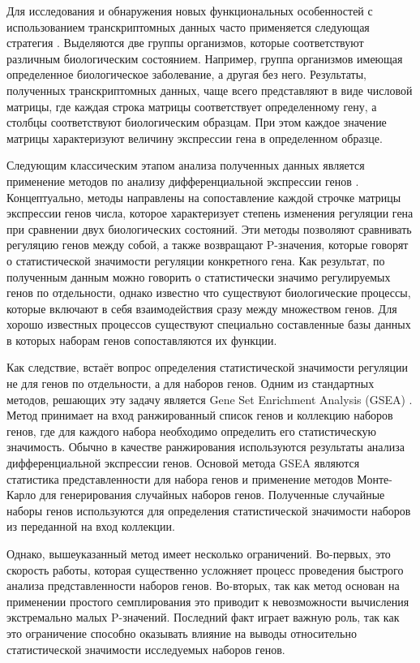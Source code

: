 Для исследования и обнаружения новых функциональных особенностей с использованием транскриптомных данных часто применяется следующая стратегия \fixme{\cite{}}.
Выделяются две группы организмов, которые соответствуют различным биологическим состоянием.
Например, группа организмов имеющая определенное биологическое заболевание, а другая без него.
Результаты, полученных транскриптомных данных, чаще всего представляют в виде числовой матрицы, где каждая строка матрицы соответствует определенному гену, а столбцы соответствуют биологическим образцам.
При этом каждое значение матрицы характеризуют величину экспрессии гена в определенном образце.

Следующим классическим этапом анализа полученных данных является применение методов по анализу дифференциальной экспрессии генов \fixme{\cite{}}. 
Концептуально, методы направлены на сопоставление каждой строчке матрицы экспрессии генов числа, которое характеризует степень изменения регуляции гена при сравнении двух биологических состояний.
Эти методы позволяют сравнивать регуляцию генов между собой, а также возвращают P-значения, которые говорят о статистической значимости регуляции конкретного гена.
Как результат, по полученным данным можно говорить о статистически значимо регулируемых генов по отдельности, однако известно что существуют биологические процессы, которые включают в себя взаимодействия сразу между множеством генов.
Для хорошо известных процессов существуют специально составленные базы данных \fixme{\cite{}} в которых наборам генов сопоставляются их функции.

Как следствие, встаёт вопрос определения статистической значимости регуляции не для генов по отдельности, а для наборов генов.
Одним из стандартных методов, решающих эту задачу является Gene Set Enrichment Analysis (GSEA) \fixme{\cite{}}.
Метод принимает на вход ранжированный список генов и коллекцию наборов генов, где для каждого набора необходимо определить его статистическую значимость. 
Обычно в качестве ранжирования используются результаты анализа дифференциальной экспрессии генов.
Основой метода GSEA являются статистика представленности для набора генов и применение методов Монте-Карло для генерирования случайных наборов генов.
Полученные случайные наборы генов используются для определения статистической значимости наборов из переданной на вход коллекции.

Однако, вышеуказанный метод имеет несколько ограничений.
Во-первых, это скорость работы, которая существенно усложняет процесс проведения быстрого анализа представленности наборов генов.
Во-вторых, так как метод основан на применении простого семплирования это приводит к невозможности вычисления экстремально малых P-значений.
Последний факт играет важную роль, так как это ограничение способно оказывать влияние на выводы относительно статистической значимости исследуемых наборов генов.

